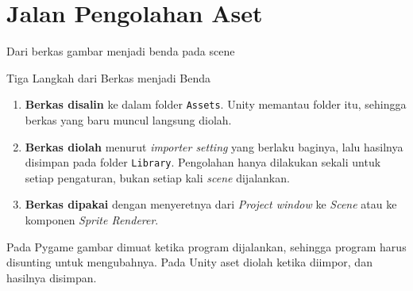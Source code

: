 \documentclass[aspectratio=169,10pt]{beamer}
\begin{document}
\section{Jalan Pengolahan Aset}
  {Dari berkas gambar menjadi benda pada scene}

\begin{frame}{Tiga Langkah dari Berkas menjadi Benda}
\begin{enumerate}
  \item \textbf{Berkas disalin} ke dalam folder \texttt{Assets}. Unity
        memantau folder itu, sehingga berkas yang baru muncul langsung diolah.
  \item \textbf{Berkas diolah} menurut \emph{importer setting} yang berlaku
        baginya, lalu hasilnya disimpan pada folder \texttt{Library}. Pengolahan
        hanya dilakukan sekali untuk setiap pengaturan, bukan setiap kali
        \emph{scene} dijalankan.
  \item \textbf{Berkas dipakai} dengan menyeretnya dari \emph{Project window}
        ke \emph{Scene} atau ke komponen \emph{Sprite Renderer}.
\end{enumerate}
\vspace{0.12cm}
\begin{kotak}
Pada Pygame gambar dimuat ketika program dijalankan, sehingga program harus
disunting untuk mengubahnya. Pada Unity aset diolah ketika diimpor, dan
hasilnya disimpan.
\end{kotak}
\end{frame}
\end{document}
